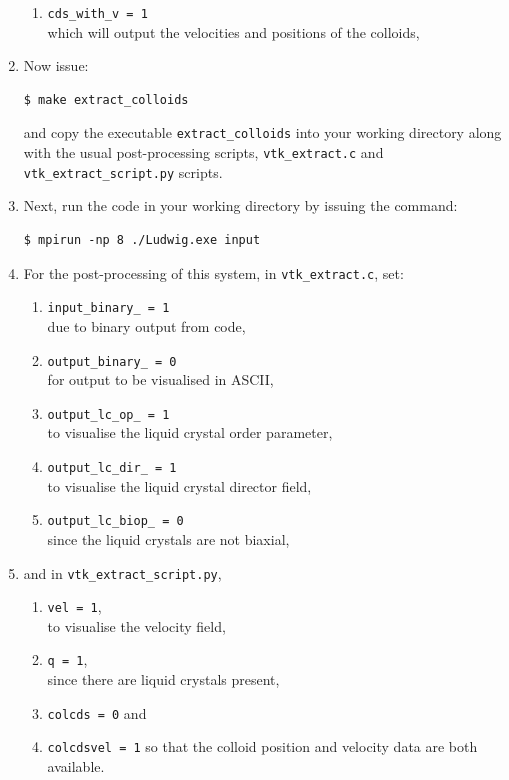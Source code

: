 \documentclass[11pt,twoside,a4paper]{article}
\begin{document}
\begin{enumerate}
\begin{enumerate}
\item \texttt{cds\_with\_v  = 1} \\ which will output the velocities and positions of the colloids,
\end{enumerate}
\item Now issue: \\
\begin{lstlisting}
$ make extract_colloids
\end{lstlisting}
and copy the executable \texttt{extract\_colloids} into your working directory along with the 
usual post-processing scripts, \texttt{vtk\_extract.c} and \texttt{vtk\_extract\_script.py} 
scripts. 
\item Next, run the code in your working directory by issuing the command:
\begin{lstlisting}
$ mpirun -np 8 ./Ludwig.exe input
\end{lstlisting}
\item For the post-processing of this system, in \texttt{vtk\_extract.c}, set:
\begin{enumerate}
\item \texttt{input\_binary\_  = 1} \\ due to binary output from code,
\item \texttt{output\_binary\_ = 0} \\ for output to be visualised in ASCII,
\item \texttt{output\_lc\_op\_   = 1} \\ to visualise the liquid crystal order parameter,
\item \texttt{output\_lc\_dir\_  = 1} \\ to visualise the liquid crystal director field,
\item \texttt{output\_lc\_biop\_ = 0} \\ since the liquid crystals are not biaxial,
\end{enumerate}
\item and in \texttt{vtk\_extract\_script.py},
\begin{enumerate}
\item \texttt{vel = 1}, \\ to visualise the velocity field,
\item \texttt{q = 1}, \\ since there are liquid crystals present,
\item \texttt{colcds = 0} and 
\item \texttt{colcdsvel = 1} so that the colloid position and velocity data are both available.

\end{enumerate}
\end{enumerate}
\end{document}
